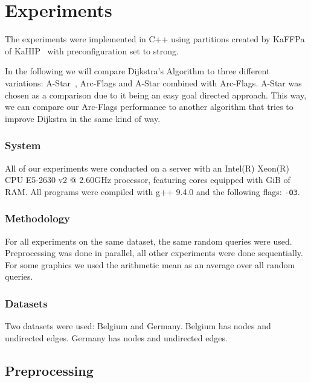 \documentclass[acmsmall,nonacm,screen,review]{acmart}
\begin{document}
\section{Experiments}
\label{5}
The experiments were implemented in C++ using partitions created by KaFFPa of KaHIP~\cite{DBLP:conf/wea/SandersS13} with preconfiguration set to strong.

In the following we will compare Dijkstra's Algorithm to three different variations: A-Star~\cite{DBLP:journals/sigart/HartNR72}, Arc-Flags and A-Star combined with Arc-Flags.
A-Star was chosen as a comparison due to it being an easy goal directed approach. This way, we can compare our Arc-Flags performance to another algorithm
that tries to improve Dijkstra in the same kind of way.

\subsubsection*{System}
All of our experiments were conducted on a server with an Intel(R) Xeon(R) CPU E5-2630 v2 @ 2.60GHz processor,
featuring  cores equipped with  GiB of RAM.
All programs were compiled with g++ 9.4.0 and the following flags: \texttt{-O3}.

\subsubsection*{Methodology}
For all experiments on the same dataset, the same  random queries were used. Preprocessing was done in parallel, all other
experiments were done sequentially. For some graphics we used the arithmetic mean as an average over all  random queries.

\subsubsection*{Datasets} 
Two datasets were used: Belgium and Germany. Belgium has  nodes and  undirected edges. Germany has 
nodes and  undirected edges.

\subsection{Preprocessing}
\end{document}
